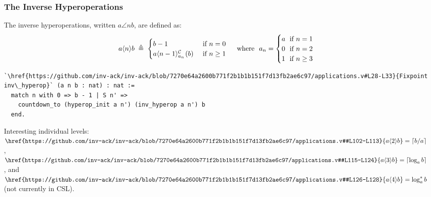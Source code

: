 \begin{frame}[fragile]
\frametitle{The Inverse Hyperoperations}
The inverse hyperoperations, written $a\angle{n}b$, are defined as:
\begin{equation*}
a\angle{n}b \; \triangleq \; \begin{cases}
b - 1 & \text{ if } n = 0 \\
\cdt{a\angle{n-1}}{a_n}(b) & \text{ if } n \ge 1
\end{cases}
\quad \text{ where } \ a_n = \begin{cases}
a & \hspace{-7pt}\text{ if } n = 1 \\
0 & \hspace{-7pt}\text{ if } n = 2 \\
1 & \hspace{-7pt}\text{ if } n \ge 3
\end{cases}
\end{equation*}
\begin{lstlisting}
`\href{https://github.com/inv-ack/inv-ack/blob/7270e64a2600b771f2b1b1b151f7d13fb2ae6c97/applications.v#L28-L33}{Fixpoint inv\_hyperop}` (a n b : nat) : nat :=
  match n with 0 => b - 1 | S n' =>
    countdown_to (hyperop_init a n') (inv_hyperop a n') b
  end.
\end{lstlisting}

\smallskip

Interesting individual levels:
$\href{https://github.com/inv-ack/inv-ack/blob/7270e64a2600b771f2b1b1b151f7d13fb2ae6c97/applications.v#L102-L113}{a\angle{2}b}
= \left\lceil b/a \right\rceil$,
$\href{https://github.com/inv-ack/inv-ack/blob/7270e64a2600b771f2b1b1b151f7d13fb2ae6c97/applications.v#L115-L124}{a\angle{3}b}
= \left\lceil \log_a b \right\rceil$, and
$\href{https://github.com/inv-ack/inv-ack/blob/7270e64a2600b771f2b1b1b151f7d13fb2ae6c97/applications.v#L126-L128}{a\angle{4}b}
= \log^*_a b$ (not currently in CSL).
\end{frame}



